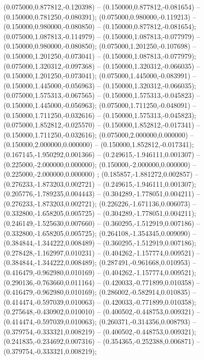  (0.075000,0.877812,-0.120398) -- (0.150000,0.877812,-0.081654) -- (0.150000,0.781250,-0.080391);
 (0.075000,0.980000,-0.119213) -- (0.150000,0.980000,-0.080850) -- (0.150000,0.877812,-0.081654);
 (0.075000,1.087813,-0.114979) -- (0.150000,1.087813,-0.077979) -- (0.150000,0.980000,-0.080850);
 (0.075000,1.201250,-0.107698) -- (0.150000,1.201250,-0.073041) -- (0.150000,1.087813,-0.077979);
 (0.075000,1.320312,-0.097368) -- (0.150000,1.320312,-0.066035) -- (0.150000,1.201250,-0.073041);
 (0.075000,1.445000,-0.083991) -- (0.150000,1.445000,-0.056963) -- (0.150000,1.320312,-0.066035);
 (0.075000,1.575313,-0.067565) -- (0.150000,1.575313,-0.045823) -- (0.150000,1.445000,-0.056963);
 (0.075000,1.711250,-0.048091) -- (0.150000,1.711250,-0.032616) -- (0.150000,1.575313,-0.045823);
 (0.075000,1.852812,-0.025570) -- (0.150000,1.852812,-0.017341) -- (0.150000,1.711250,-0.032616);
 (0.075000,2.000000,0.000000) -- (0.150000,2.000000,0.000000) -- (0.150000,1.852812,-0.017341);
 (0.167145,-1.950292,0.001366) -- (0.249615,-1.946111,0.001307) -- (0.225000,-2.000000,0.000000);
 (0.150000,-2.000000,0.000000) -- (0.225000,-2.000000,0.000000) ;
 (0.185857,-1.881272,0.002857) -- (0.276233,-1.873203,0.002721) -- (0.249615,-1.946111,0.001307);
 (0.205776,-1.789235,0.004443) -- (0.304289,-1.778051,0.004211) -- (0.276233,-1.873203,0.002721);
 (0.226226,-1.671136,0.006073) -- (0.332800,-1.658205,0.005725) -- (0.304289,-1.778051,0.004211);
 (0.246149,-1.525630,0.007660) -- (0.360295,-1.512919,0.007186) -- (0.332800,-1.658205,0.005725);
 (0.264108,-1.354345,0.009090) -- (0.384844,-1.344222,0.008489) -- (0.360295,-1.512919,0.007186);
 (0.278428,-1.162997,0.010231) -- (0.404262,-1.157774,0.009521) -- (0.384844,-1.344222,0.008489);
 (0.287491,-0.961668,0.010953) -- (0.416479,-0.962980,0.010169) -- (0.404262,-1.157774,0.009521);
 (0.290136,-0.763660,0.011164) -- (0.420033,-0.771899,0.010358) -- (0.416479,-0.962980,0.010169);
 (0.286002,-0.582914,0.010835) -- (0.414474,-0.597039,0.010063) -- (0.420033,-0.771899,0.010358);
 (0.275648,-0.430902,0.010010) -- (0.400502,-0.448753,0.009321) -- (0.414474,-0.597039,0.010063);
 (0.260371,-0.314356,0.008793) -- (0.379754,-0.333321,0.008219) -- (0.400502,-0.448753,0.009321);
 (0.241835,-0.234692,0.007316) -- (0.354365,-0.252388,0.006871) -- (0.379754,-0.333321,0.008219);

